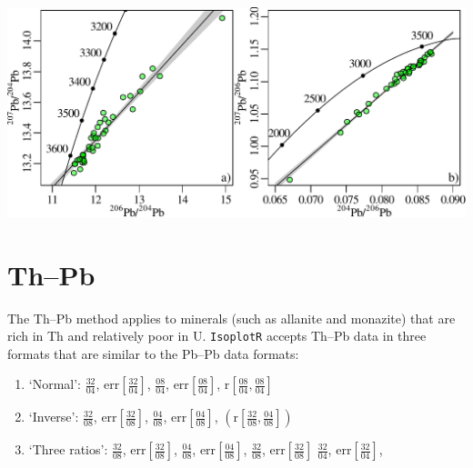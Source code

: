 \begin{refsection}
\begin{center}
\noindent\includegraphics[width=.8\linewidth]{../figures/Kamber.pdf}
\label{fig:Kamber}
\end{center}

\section{Th--Pb}\label{sec:ThPb}

The Th--Pb method applies to minerals (such as allanite and monazite)
that are rich in Th and relatively poor in U. \texttt{IsoplotR}
accepts Th--Pb data in three formats that are similar to the Pb--Pb
data formats:

\begin{enumerate}
\item{`Normal':}
  $\frac{32}{04}$,  
  $\mbox{err}\!\left[\frac{32}{04}\right]$, 
  $\frac{08}{04}$,  
  $\mbox{err}\!\left[\frac{08}{04}\right]$,  
  $\mbox{r}\!\left[\frac{08}{04},\frac{08}{04}\right]$
\item{`Inverse':}
  $\frac{32}{08}$,  
  $\mbox{err}\!\left[\frac{32}{08}\right]$, 
  $\frac{04}{08}$,  
  $\mbox{err}\!\left[\frac{04}{08}\right]$, 
  $\left(\mbox{r}\!\left[\frac{32}{08},\frac{04}{08}\right]\right)$
\item{`Three ratios':}
  $\frac{32}{08}$,  
  $\mbox{err}\!\left[\frac{32}{08}\right]$, 
  $\frac{04}{08}$,  
  $\mbox{err}\!\left[\frac{04}{08}\right]$,  
  $\frac{32}{08}$,  
  $\mbox{err}\!\left[\frac{32}{08}\right]$
  $\frac{32}{04}$,  
  $\mbox{err}\!\left[\frac{32}{04}\right]$, 
\end{enumerate}


\end{refsection}
